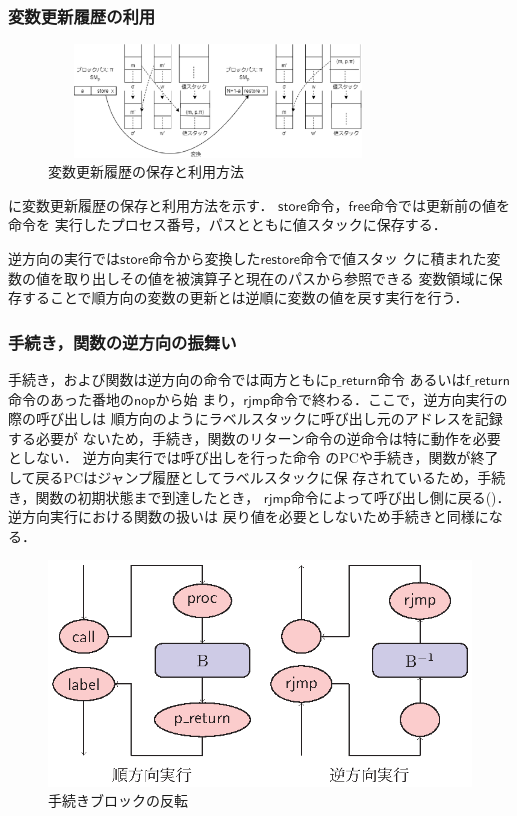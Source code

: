 \documentclass[submit,PRO]{ipsj}
\newcommand{\bcode}[1]{$\mathsf{#1}$}
\begin{document}
\subsubsection{変数更新履歴の利用}

\begin{figure}[tb]
\includegraphics[height=3.0cm,width=9.0cm]{./store.eps}
\caption{変数更新履歴の保存と利用方法}
\label{fig:store}
\end{figure}

に変数更新履歴の保存と利用方法を示す．
\bcode{store}命令，\bcode{free}命令では更新前の値を命令を
実行したプロセス番号，パスとともに値スタックに保存する．

逆方向の実行では\bcode{store}命令から変換した\bcode{restore}命令で値スタッ
クに積まれた変数の値を取り出しその値を被演算子と現在のパスから参照できる
変数領域に保存することで順方向の変数の更新とは逆順に変数の値を戻す実行を行う．

\subsubsection{手続き，関数の逆方向の振舞い}

手続き，および関数は逆方向の命令では両方ともに\bcode{p\_return}命令
あるいは\bcode{f\_return}命令のあった番地の\bcode{nop}から始
まり，\bcode{rjmp}命令で終わる．ここで，逆方向実行の際の呼び出しは
順方向のようにラベルスタックに呼び出し元のアドレスを記録する必要が
ないため，手続き，関数のリターン命令の逆命令は特に動作を必要としない．
逆方向実行では呼び出しを行った命令
のPCや手続き，関数が終了して戻るPCはジャンプ履歴としてラベルスタックに保
存されているため，手続き，関数の初期状態まで到達したとき，
\bcode{rjmp}命令によって呼び出し側に戻る()．逆方向実行における関数の扱いは
戻り値を必要としないため手続きと同様になる．

\begin{figure}[tb]
\begin{center}
\includegraphics[width=.75\linewidth]{./proc-flow.eps}
\end{center}
\caption{手続きブロックの反転}
\label{fig:procFlow}
\end{figure}
\end{document}
